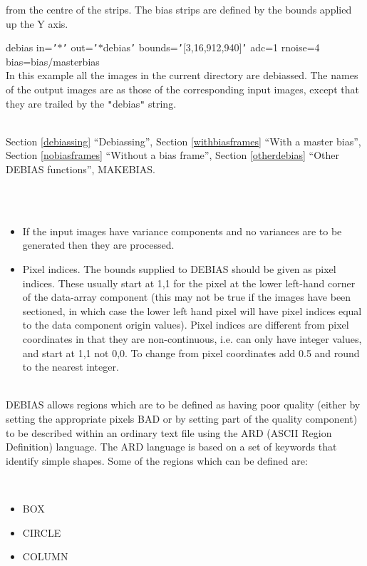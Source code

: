 \documentclass[twoside,11pt]{article}
\newcommand{\htmlref}[2]{#1}
\newcommand{\latexhtml}[2]{#1}
\renewcommand{\_}{\texttt{\symbol{95}}}
\newcommand{\qt}[1]{{\tt "}#1{\tt "}}
\newcommand{\qs}[1]{{\tt '}#1{\tt '}}
\newcommand{\routine}[1]{{\sc #1}}
\newcommand{\xroutine}[1]{\htmlref{{\sc #1}}{#1}}
\newcommand{\secref}[2]{\latexhtml{Section \ref{#1} ``#2''}{``\htmlref{#2}{#1}''}}
\newcommand{\sstexamplesubsection}[2]{\sloppy \item{\ssttt #1} \mbox{} \\ #2 }
\newcommand{\sstnotes}[1]{\item[Notes:] \mbox{} \\[1.3ex] #1}
\newcommand{\sstdiytopic}[2]{\item[#1:] \mbox{} \\[1.3ex] #2}
\newcommand{\sstitemlist}[1]{
  \mbox{} \\
  \vspace{-3.5ex}
  \begin{itemize}
     #1
  \end{itemize}
}
\newcommand{\sstitem}{\item}
\newcommand{\sstexamplesubsection}[2]{\item[{\ssttt #1}] #2}
\newcommand{\sstnotes}[1]{\item[Notes:] #1 }
\newcommand{\sstdiytopic}[2]{\item[{#1:}] #2 }
\newcommand{\sstitemlist}[1]{
      \begin{itemize}
         #1
      \end{itemize}
      \\
   }
\newcommand{\sstitem}{\item}
\begin{document}
{{{         from the centre of the strips. The bias strips are defined by
         the bounds applied up the Y axis.
      }
      \sstexamplesubsection{
         debias in=\qs{$*$} out=\qs{$*$\_debias}
             bounds=\qs{[3,16,912,940]} adc=1 rnoise=4
             bias=bias/master\_bias
      } {
         In this example all the images in the current directory are
         debiassed. The names of the output images are as those of the
         corresponding input images, except that they are trailed by the
         \qt{\_debias} string.
      }
   }
   \sstdiytopic{
      See also
   } {
      \secref{debiassing}{Debiassing},
      \secref{withbiasframes}{With a master bias},
      \secref{nobiasframes}{Without a bias frame},
      \secref{otherdebias}{Other DEBIAS functions},
      \xroutine{MAKEBIAS}.
   }
   \sstnotes{
      \sstitemlist{

         \sstitem
         If the input images have variance components and no variances
           are to be generated then they are processed.

         \sstitem
         Pixel indices. The bounds supplied to \routine{DEBIAS} should be given as
           pixel indices. These usually start at 1,1 for the pixel at the
           lower left-hand corner of the data-array component (this may
           not be true if the images have been sectioned, in which case the
           lower left hand pixel will have pixel indices equal to the data
           component origin values). Pixel indices are different from
           pixel coordinates in that they are non-continuous, i.e. can
           only have integer values, and start at 1,1 not 0,0. To change
           from pixel coordinates add 0.5 and round to the nearest integer.
      }
   }
   \sstdiytopic{
      ASCII\_region\_definition files
   } {
      \routine{DEBIAS} allows regions which are to be defined as having poor
      quality (either by setting the appropriate pixels BAD or by
      setting part of the quality component) to be described within an
      ordinary text file using the ARD (ASCII Region Definition)
      language. The ARD language is based on a set of keywords that
      identify simple shapes. Some of the regions which can be defined
      are:

      \sstitemlist{

         \sstitem
            BOX

         \sstitem
            CIRCLE

         \sstitem
            COLUMN

}}}
\end{document}
